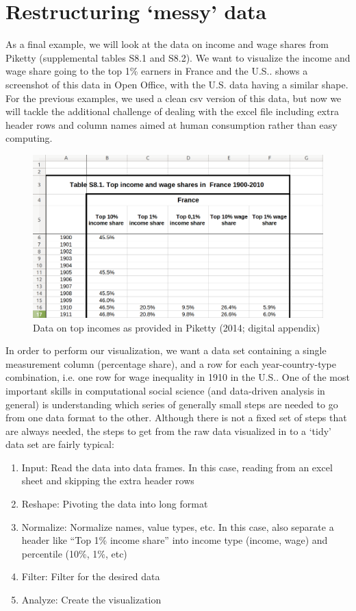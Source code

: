 \section{Restructuring `messy' data}

As a final example, we will look at the data on income and wage shares from Piketty (supplemental tables S8.1 and S8.2).
We want to visualize the income and wage share going to the top 1\% earners in France and the U.S..
 shows a screenshot of this data in Open Office, with the U.S. data having a similar shape.
For the previous examples, we used a clean csv version of this data, but now we will tackle the additional challenge
of dealing with the excel file including extra header rows and column names aimed at human consumption rather than easy computing. 

\begin{figure}
  \includegraphics[width=\linewidth]{chapter07/messy.png}
  \caption{Data on top incomes as provided in Piketty (2014; digital appendix)}\label{fig:messy}
\end{figure}

In order to perform our visualization, we want a data set containing a single measurement column (percentage share),
and a row for each year-country-type combination, i.e. one row for wage inequality in 1910 in the U.S..
One of the most important skills in computational social science (and data-driven analysis in general) is
understanding which series of generally small steps are needed to go from one data format to the other.
Although there is not a fixed set of steps that are always needed, the steps to get from the raw data visualized in  to a `tidy' data set are fairly typical:

\begin{enumerate}
  \item Input: Read the data into data frames. In this case, reading from an excel sheet and skipping the extra header rows
  \item Reshape: Pivoting the data into long format
  \item Normalize: Normalize names, value types, etc. In this case, also separate a header like ``Top 1\% income share'' into income type (income, wage) and percentile (10\%, 1\%, etc)
  \item Filter: Filter for the desired data
  \item Analyze: Create the visualization
\end{enumerate}

